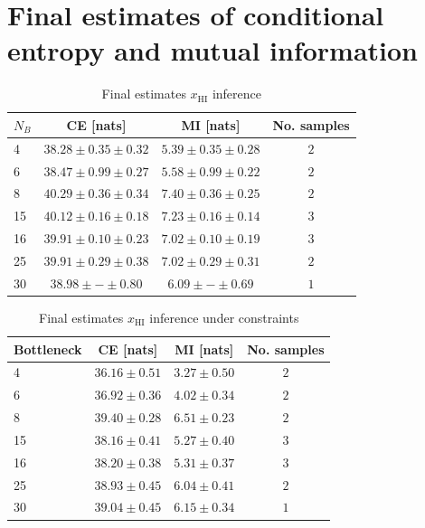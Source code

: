 \section{Final estimates of conditional entropy and mutual information}

\begin{table}[htbp]
\centering
\caption{Final estimates $x_\text{HI}$ inference}
\begin{tabular}{l |c |c |c}
\toprule

$N_B$ & CE [nats]& MI [nats]& No. samples\\
\midrule
4  & $38.28 \pm 0.35 \pm 0.32$ & $5.39 \pm 0.35 \pm 0.28$ & $2$ \\
6  & $38.47 \pm 0.99 \pm 0.27$ & $5.58 \pm 0.99 \pm 0.22$ & $2$ \\
8  & $40.29 \pm 0.36 \pm 0.34$ & $7.40 \pm 0.36 \pm 0.25$ & $2$ \\
15 & $40.12 \pm 0.16 \pm 0.18$ & $7.23 \pm 0.16 \pm 0.14$ & $3$ \\
16 & $39.91 \pm 0.10 \pm 0.23$ & $7.02 \pm 0.10 \pm 0.19$ & $3$ \\
25 & $39.91 \pm 0.29 \pm 0.38$ & $7.02 \pm 0.29 \pm 0.31$ & $2$ \\
30 & $38.98 \pm -    \pm 0.80$ & $6.09 \pm -    \pm 0.69$ & $1$ \\

\bottomrule
\end{tabular}
\end{table}

\begin{table}[htbp]
\centering
\caption{Final estimates $x_\text{HI}
$ inference under constraints}
\begin{tabular}{l |c |c |c}
\toprule

Bottleneck & CE [nats]& MI [nats]& No. samples\\
\midrule
4  & $36.16 \pm 0.51$ & $3.27 \pm 0.50$ & $2$ \\
6  & $36.92 \pm 0.36$ & $4.02 \pm 0.34$ & $2$ \\
8  & $39.40 \pm 0.28$ & $6.51 \pm 0.23$ & $2$ \\
15 & $38.16 \pm 0.41$ & $5.27 \pm 0.40$ & $3$ \\
16 & $38.20 \pm 0.38$ & $5.31 \pm 0.37$ & $3$ \\
25 & $38.93 \pm 0.45$ & $6.04 \pm 0.41$ & $2$ \\
30 & $39.04 \pm 0.45$ & $6.15 \pm 0.34$ & $1$ \\

\bottomrule
\end{tabular}
\end{table}


